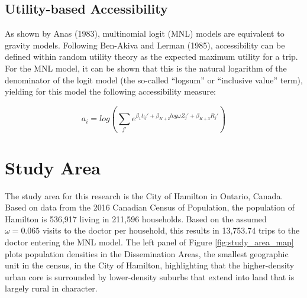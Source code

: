 \documentclass[]{elsarticle} %
\begin{document}
\hypertarget{utility-based-accessibility}{%
\subsection{Utility-based
Accessibility}\label{utility-based-accessibility}}

As shown by Anas (1983), multinomial logit (MNL) models are equivalent
to gravity models. Following Ben-Akiva and Lerman (1985), accessibility
can be defined within random utility theory as the expected maximum
utility for a trip. For the MNL model, it can be shown that this is the
natural logarithm of the denominator of the logit model (the so-called
``logsum'' or ``inclusive value'' term), yielding for this model the
following accessibility measure:

\[
a_i = log(\sum_{j\prime} e^{\beta_1 t_{ij}\prime + \beta_{K+2} log \omega Z_j\prime + \beta_{K + 3} R_j\prime})
\]

\hypertarget{study-area}{%
\section{Study Area}\label{study-area}}

The study area for this research is the City of Hamilton in Ontario,
Canada. Based on data from the 2016 Canadian Census of Population, the
population of Hamilton is 536,917 living in 211,596 households. Based on
the assumed \(\omega = 0.065\) visits to the doctor per household, this
results in 13,753.74 trips to the doctor entering the MNL model. The
left panel of Figure \ref{fig:study_area_map} plots population densities
in the Dissemination Areas, the smallest geographic unit in the census,
in the City of Hamilton, highlighting that the higher-density urban core
is surrounded by lower-density suburbs that extend into land that is
largely rural in character.
\end{document}
